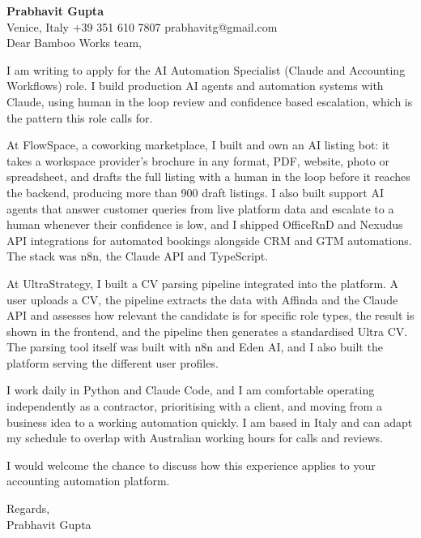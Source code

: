 \documentclass[a4paper,10.5pt]{article}
\begin{document}
\textbf{Prabhavit Gupta}\\
Venice, Italy \textbar{} +39 351 610 7807 \textbar{} prabhavitg@gmail.com\\[10pt]
Dear Bamboo Works team,

I am writing to apply for the AI Automation Specialist (Claude and Accounting Workflows) role. I build production AI agents and automation systems with Claude, using human in the loop review and confidence based escalation, which is the pattern this role calls for.

At FlowSpace, a coworking marketplace, I built and own an AI listing bot: it takes a workspace provider's brochure in any format, PDF, website, photo or spreadsheet, and drafts the full listing with a human in the loop before it reaches the backend, producing more than 900 draft listings. I also built support AI agents that answer customer queries from live platform data and escalate to a human whenever their confidence is low, and I shipped OfficeRnD and Nexudus API integrations for automated bookings alongside CRM and GTM automations. The stack was n8n, the Claude API and TypeScript.

At UltraStrategy, I built a CV parsing pipeline integrated into the platform. A user uploads a CV, the pipeline extracts the data with Affinda and the Claude API and assesses how relevant the candidate is for specific role types, the result is shown in the frontend, and the pipeline then generates a standardised Ultra CV. The parsing tool itself was built with n8n and Eden AI, and I also built the platform serving the different user profiles.

I work daily in Python and Claude Code, and I am comfortable operating independently as a contractor, prioritising with a client, and moving from a business idea to a working automation quickly. I am based in Italy and can adapt my schedule to overlap with Australian working hours for calls and reviews.

I would welcome the chance to discuss how this experience applies to your accounting automation platform.

Regards,\\
Prabhavit Gupta
\end{document}
